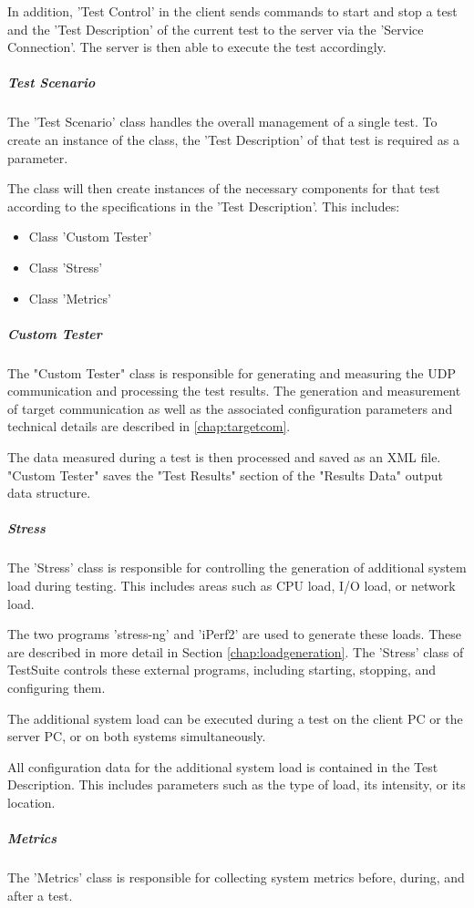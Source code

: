 In addition, 'Test Control' in the client sends commands to start and stop a test and the 'Test Description' of the current test to the server via the 'Service Connection'. The server is then able to execute the test accordingly.

\subparagraph{Test Scenario}
The 'Test Scenario' class handles the overall management of a single test. To create an instance of the class, the 'Test Description' of that test is required as a parameter.

The class will then create instances of the necessary components for that test according to the specifications in the 'Test Description'. This includes:
\begin{itemize}
	\item Class 'Custom Tester'
	\item Class 'Stress'
	\item Class 'Metrics'
\end{itemize}

\subparagraph{Custom Tester} \label{chap:customtester}
The "Custom Tester" class is responsible for generating and measuring the UDP communication and processing the test results. The generation and measurement of target communication as well as the associated configuration parameters and technical details are described in \ref{chap:targetcom}.

The data measured during a test is then processed and saved as an XML file. "Custom Tester" saves the "Test Results" section of the "Results Data" output data structure.

\subparagraph{Stress}
The 'Stress' class is responsible for controlling the generation of additional system load during testing. This includes areas such as CPU load, I/O load, or network load.

The two programs 'stress-ng' and 'iPerf2' are used to generate these loads. These are described in more detail in Section \ref{chap:loadgeneration}. The 'Stress' class of TestSuite controls these external programs, including starting, stopping, and configuring them.

The additional system load can be executed during a test on the client PC or the server PC, or on both systems simultaneously.

All configuration data for the additional system load is contained in the Test Description. This includes parameters such as the type of load, its intensity, or its location.

\subparagraph{Metrics}
The 'Metrics' class is responsible for collecting system metrics before, during, and after a test.

